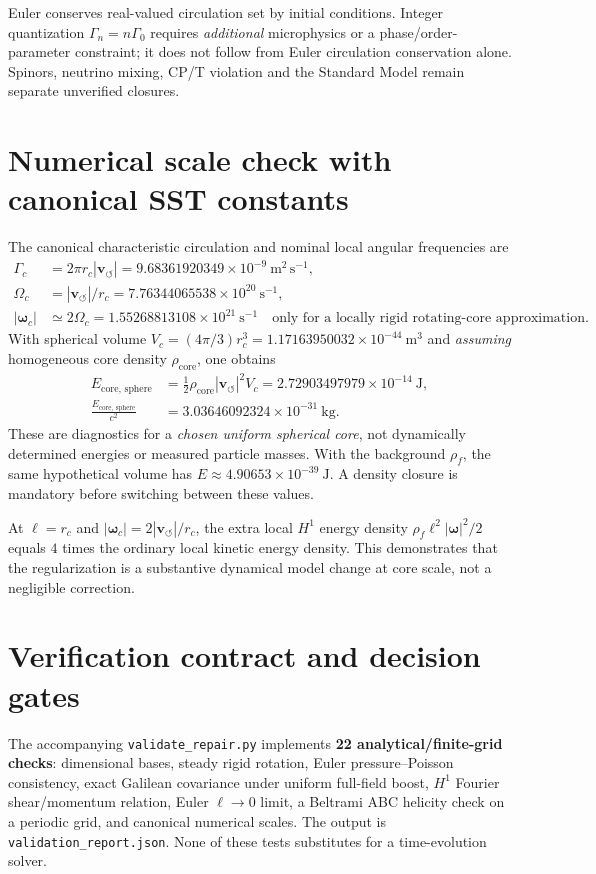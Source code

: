 \documentclass[11pt,a4paper]{article}
\newcommand{\rhoF}{\rho_{\!f}}
\newcommand{\rc}{r_c}
\newcommand{\vswirl}{\mathbf{v}_{\!\boldsymbol{\circlearrowleft}}}
\newcommand{\om}{\boldsymbol{\omega}}
\begin{document}
Euler conserves real-valued circulation set by initial conditions. Integer quantization $\Gamma_n=n\Gamma_0$ requires \emph{additional} microphysics or a phase/order-parameter constraint; it does not follow from Euler circulation conservation alone. Spinors, neutrino mixing, CP/T violation and the Standard Model remain separate unverified closures.

\section{Numerical scale check with canonical SST constants}
The canonical characteristic circulation and nominal local angular frequencies are
\begin{align}
\Gamma_c&=2\pi\rc |\vswirl|=9.68361920349\times10^{-9}\ \mathrm{m^2\,s^{-1}},\\
\Omega_c&=|\vswirl|/\rc=7.76344065538\times10^{20}\ \mathrm{s^{-1}},\\
|\om_c|&\simeq2\Omega_c=1.55268813108\times10^{21}\ \mathrm{s^{-1}}
\quad\text{only for a locally rigid rotating-core approximation}.
\end{align}
With spherical volume $V_c=(4\pi/3)\rc^3=1.17163950032\times10^{-44}\ \mathrm{m^3}$ and \emph{assuming} homogeneous core density $\rho_{\mathrm{core}}$, one obtains
\begin{align}
E_{\mathrm{core},\,\mathrm{sphere}}&=\frac12\rho_{\mathrm{core}}|\vswirl|^2V_c
=2.72903497979\times10^{-14}\ \mathrm J,\\
\frac{E_{\mathrm{core},\,\mathrm{sphere}}}{c^2}&=3.03646092324\times10^{-31}\ \mathrm{kg}.
\end{align}
These are diagnostics for a \emph{chosen uniform spherical core}, not dynamically determined energies or measured particle masses. With the background $\rhoF$, the same hypothetical volume has $E\approx4.90653\times10^{-39}\ \mathrm J$. A density closure is mandatory before switching between these values.

At $\ell=\rc$ and $|\om_c|=2|\vswirl|/\rc$, the extra local $H^1$ energy density $\rhoF\ell^2|\om|^2/2$ equals $4$ times the ordinary local kinetic energy density. This demonstrates that the regularization is a substantive dynamical model change at core scale, not a negligible correction.

\section{Verification contract and decision gates}
The accompanying \texttt{validate\_repair.py} implements \textbf{22 analytical/finite-grid checks}: dimensional bases, steady rigid rotation, Euler pressure--Poisson consistency, exact Galilean covariance under uniform full-field boost, $H^1$ Fourier shear/momentum relation, Euler $\ell\rightarrow0$ limit, a Beltrami ABC helicity check on a periodic grid, and canonical numerical scales. The output is \texttt{validation\_report.json}. None of these tests substitutes for a time-evolution solver.
\end{document}
